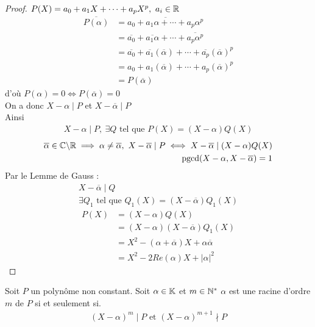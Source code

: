 \begin{proof}
$P(X) = a_0 + a_1X + \cdots + a_p X^p,\ a_i \in \mathbb{R}$
\begin{align*}
\overline{P(\alpha)} &= \overline{a_0 + a_1\alpha + \cdots + a_p \alpha^p} \\
&= \overline{a_0} + \overline{a_1\alpha} + \cdots + \overline{a_p \alpha^p} \\
&= \overline{a_0} + \overline{a_1}(\overline{\alpha}) + \cdots + \overline{a_p}(\overline{\alpha})^p \\
&= a_0 + a_1 (\overline{\alpha}) + \cdots + a_p (\overline{\alpha})^p \\
&= P(\overline{\alpha})
\end{align*}
d'où $P(\alpha) = 0 \iff P(\overline{\alpha}) = 0$
\\
On a donc $X - \alpha \mid P$ et $X - \overline{\alpha} \mid P$ \\
Ainsi 
\begin{align*}
X - \alpha \mid P,\ \exists Q \text{ tel que } P(X) = (X - \alpha)Q(X)
\end{align*}
\begin{align*}
\overline{\alpha} \in \mathbb{C} \backslash \mathbb{R} \implies \alpha \neq \overline{\alpha}, \ X - \overline{\alpha} \mid P \iff X - \overline{\alpha} \mid (X - \alpha) Q(X) \\
\mathrm{pgcd}(X - \alpha, X - \overline{\alpha}) = 1
\end{align*}
Par le Lemme de Gauss :
\begin{align*}
X - \overline{\alpha} \mid Q \\
\exists Q_1 \text{ tel que } Q_1(X) = (X - \overline{\alpha})Q_1(X)
\end{align*}
\begin{align*}
P(X) &= (X - \alpha) Q(X) \\
	 &= (X - \alpha)(X - \overline{\alpha}) Q_1(X) \\
	 &= X^2 - (\alpha + \overline{\alpha})X + \alpha \overline{\alpha} \\
	 &= X^2 - 2Re(\alpha)X + |\alpha|^2
\end{align*}
\end{proof}

\begin{graybox}
\begin{definition}
Soit $P$ un polynôme non constant. Soit $\alpha \in \mathbb{K}$ et $m \in \mathbb{N}^*$ $\alpha$ est une racine d'ordre $m$ de $P$ si et seulement si.
\begin{align*}
(X - \alpha)^m \mid P \text{ et } (X - \alpha)^{m+1} \nmid P
\end{align*}
\end{definition}
\end{graybox}

